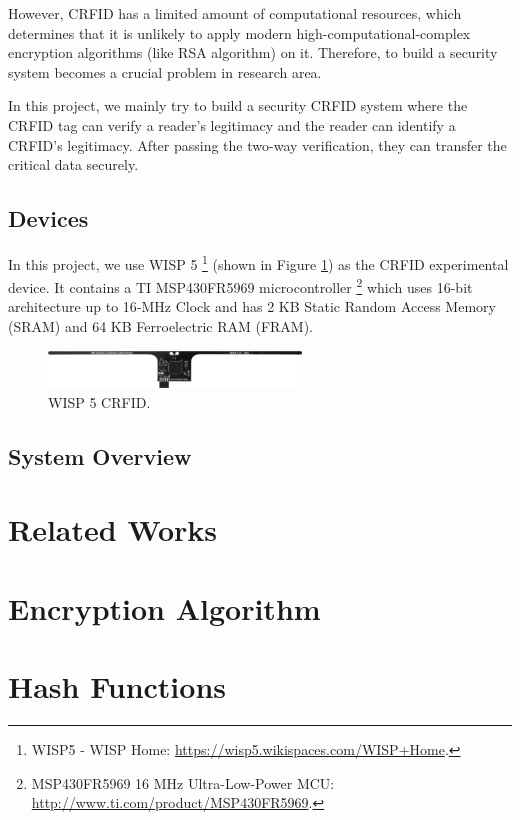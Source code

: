 \documentclass[sigconf, review=false]{acmart}
\begin{document}
However, CRFID has a limited amount of computational resources, which determines that it is unlikely to apply
modern high-computational-complex encryption algorithms (like RSA algorithm) on it.
Therefore, to build a security system becomes a crucial problem in research area.

In this project, we mainly try to build a security CRFID system
where the CRFID tag can verify a reader's legitimacy and the reader can identify a CRFID's legitimacy.
After passing the two-way verification, they can transfer the critical data securely.

\subsection{Devices}
In this project, we use WISP 5 \footnote{WISP5 - WISP Home: \url{https://wisp5.wikispaces.com/WISP+Home}.} (shown in Figure \ref{fig-wisp5})
as the CRFID experimental device.
It contains a TI MSP430FR5969 microcontroller \footnote{MSP430\texttrademark FR5969 16 MHz Ultra-Low-Power MCU: \url{http://www.ti.com/product/MSP430FR5969}.}
which uses 16-bit architecture up to 16‑MHz Clock and has 2 KB Static Random Access Memory (SRAM) and 64 KB Ferroelectric RAM (FRAM).

\begin{figure}
\centering
\includegraphics[width=0.6\textwidth]{wisp5.png}
\caption{WISP 5 CRFID.}
\label{fig-wisp5}
\end{figure}


\subsection{System Overview}


\section{Related Works}


\section{Encryption Algorithm}


\section{Hash Functions}
\end{document}
